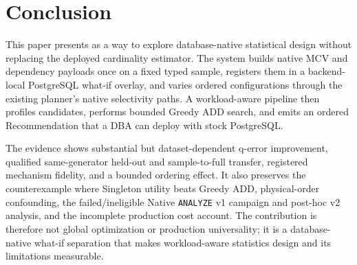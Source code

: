 \section{Conclusion}

This paper presents \advisor as a way to explore database-native statistical
design without replacing the deployed cardinality estimator. The system builds
native MCV and dependency payloads once on a fixed typed sample, registers them
in a backend-local PostgreSQL what-if overlay, and varies ordered
configurations through the existing planner's native selectivity paths. A
workload-aware pipeline then profiles candidates, performs bounded Greedy ADD
search, and emits an ordered Recommendation that a DBA can deploy with stock
PostgreSQL.

The evidence shows substantial but dataset-dependent q-error improvement,
qualified same-generator held-out and sample-to-full transfer, registered
mechanism fidelity, and a bounded ordering effect. It also preserves the
counterexample where Singleton utility beats Greedy ADD, physical-order
confounding, the failed/ineligible Native \texttt{ANALYZE} v1 campaign and
post-hoc v2 analysis, and the incomplete production cost account. The
contribution is therefore not global optimization or production universality;
it is a database-native what-if separation that makes workload-aware
statistics design and its limitations measurable.
